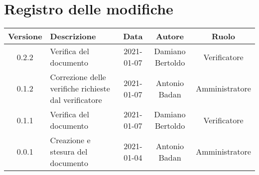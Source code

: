 \section*{Registro delle modifiche}

\begin{center}
	\begin{longtable}{|c|p{5cm}|c|c|c|}
	\hline
	\rowcolor{lighter-grayer}
	\textbf{Versione} & \textbf{Descrizione} & \textbf{Data} & \textbf{Autore} & \textbf{Ruolo} \\
	\hline
	\endfirsthead


	\hline
	0.2.2 & Verifica del documento & 2021-01-07 & Damiano Bertoldo & Verificatore \\
	\hline
	0.1.2 & Correzione delle verifiche richieste dal verificatore  & 2021-01-07 & Antonio Badan & Amministratore \\
	\hline
	0.1.1 & Verifica del documento & 2021-01-07 & Damiano Bertoldo & Verificatore \\
	\hline
	0.0.1 & Creazione e stesura del documento & 2021-01-04 & Antonio Badan & Amministratore \\
	\hline
	\end{longtable}
\end{center}